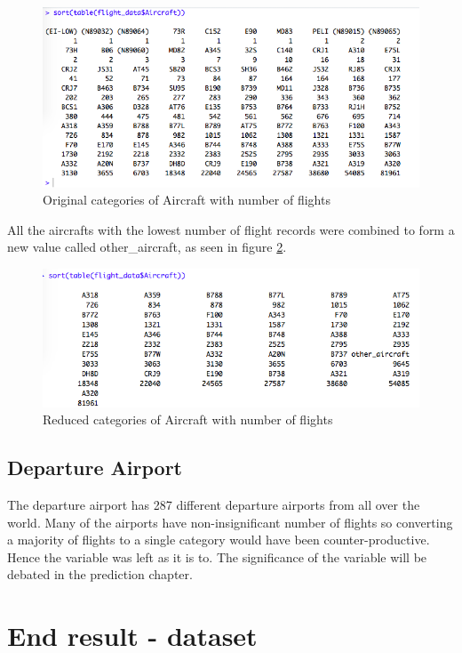 \begin{figure}[ht]
    \centering
    \includegraphics[width=\textwidth]{Figures/Aircraft_orig_levels.png}
    \caption{Original categories of Aircraft with number of flights}
    \label{fig:aircraft1}
\end{figure}

All the aircrafts with the lowest number of flight records were combined to form a new value called other\_aircraft, as seen in figure \ref{fig:aircraft2}.

\begin{figure}[ht]
    \centering
    \includegraphics[width=\textwidth]{Figures/Aircraft_reduced_levels.png}
    \caption{Reduced categories of Aircraft with number of flights}
    \label{fig:aircraft2}
\end{figure}

\subsection{Departure Airport}
The departure airport has 287 different departure airports from all over the world. Many of the airports have non-insignificant number of flights so converting a majority of flights to a single category would have been counter-productive. Hence the variable was left as it is to. The significance of the variable will be debated in the prediction chapter.

\section{End result - dataset}

